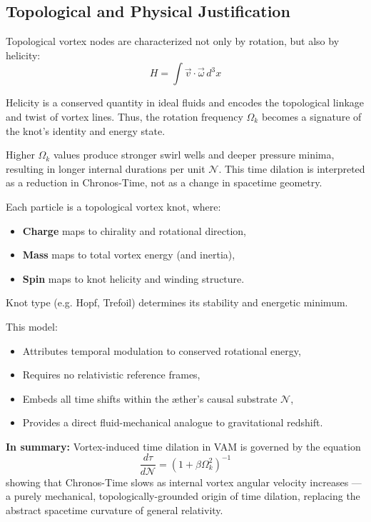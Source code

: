 \subsection{Topological and Physical Justification}

Topological vortex nodes are characterized not only by rotation, but also by helicity:
\begin{equation}
    H = \int \vec{v} \cdot \vec{\omega} \, d^3x
\end{equation}

Helicity is a conserved quantity in ideal fluids and encodes the topological linkage and twist of vortex lines. Thus, the rotation frequency $\Omega_k$ becomes a signature of the knot’s identity and energy state.

Higher $\Omega_k$ values produce stronger swirl wells and deeper pressure minima, resulting in longer internal durations per unit $\mathcal{N}$. This time dilation is interpreted as a reduction in Chronos-Time, not as a change in spacetime geometry.

Each particle is a topological vortex knot, where:
\begin{itemize}
    \item \textbf{Charge} maps to chirality and rotational direction,
    \item \textbf{Mass} maps to total vortex energy (and inertia),
    \item \textbf{Spin} maps to knot helicity and winding structure.
\end{itemize}

Knot type (e.g. Hopf, Trefoil) determines its stability and energetic minimum.

This model:

\begin{itemize}
    \item Attributes temporal modulation to conserved rotational energy,
    \item Requires no relativistic reference frames,
    \item Embeds all time shifts within the æther’s causal substrate $\mathcal{N}$,
    \item Provides a direct fluid-mechanical analogue to gravitational redshift.
\end{itemize}

\textbf{In summary:} Vortex-induced time dilation in VAM is governed by the equation
\[
    \frac{d\tau}{d\mathcal{N}} = \left(1 + \beta \Omega_k^2 \right)^{-1}
\]
showing that Chronos-Time slows as internal vortex angular velocity increases — a purely mechanical, topologically-grounded origin of time dilation, replacing the abstract spacetime curvature of general relativity.
